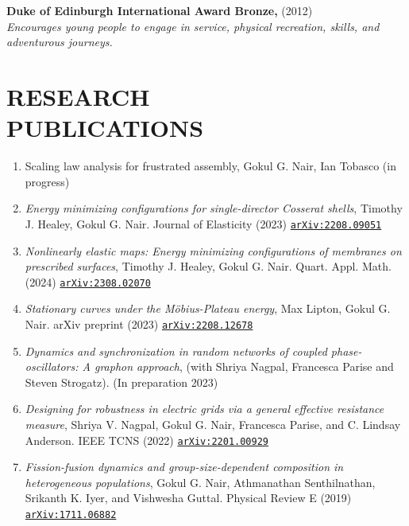 \documentclass[margin]{res} %
\begin{document}
\begin{resume}
{\bf Duke of Edinburgh International Award Bronze,} (2012)\\
\textit{Encourages young people to engage in service, physical recreation, skills, and adventurous journeys.}

\section{RESEARCH\\PUBLICATIONS}
\begin{enumerate}
	\item {Scaling law analysis for frustrated assembly}, Gokul G. Nair, Ian Tobasco (in progress)

	\item {\sl Energy minimizing configurations for single-director Cosserat shells}, Timothy J. Healey, Gokul G. Nair. Journal of Elasticity (2023) \href{https://arxiv.org/abs/2208.09051}{\texttt{arXiv:2208.09051}}

	\item {\sl Nonlinearly elastic maps: Energy minimizing configurations of membranes on prescribed surfaces}, Timothy J. Healey, Gokul G. Nair. Quart. Appl. Math. (2024) \href{https://arxiv.org/abs/2308.02070}{\texttt{arXiv:2308.02070}} 
	
	\item {\sl Stationary curves under the M\"obius-Plateau energy}, Max Lipton, Gokul G. Nair. arXiv preprint (2023) \href{https://arxiv.org/abs/2208.12678}{\texttt{arXiv:2208.12678}} 
	
	\item {\sl Dynamics and synchronization in random networks of coupled phase-oscillators: A graphon approach}, (with Shriya Nagpal, Francesca Parise and Steven Strogatz). (In preparation 2023)
	
	\item {\sl Designing for robustness in electric grids via a general effective resistance measure}, Shriya V. Nagpal, Gokul G. Nair, Francesca Parise, and C. Lindsay Anderson. IEEE TCNS (2022) \href{https://arxiv.org/abs/2201.00929}{\texttt{arXiv:2201.00929}}
	
	\item {\sl Fission-fusion dynamics and group-size-dependent composition in heterogeneous populations}, Gokul G. Nair, Athmanathan Senthilnathan, Srikanth K. Iyer, and Vishwesha Guttal. Physical Review E (2019) \href{https://arxiv.org/abs/1711.06882}{\texttt{arXiv:1711.06882}}
\end{enumerate}


\end{resume}
\end{document}
